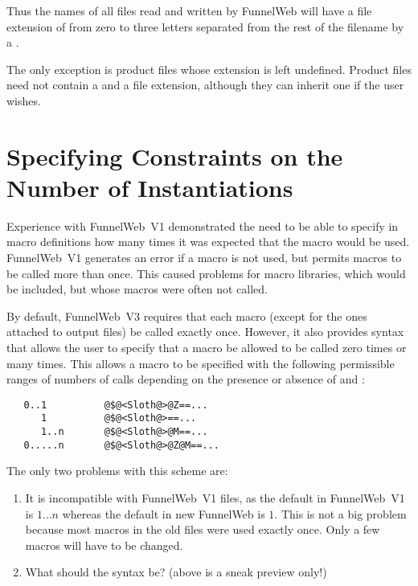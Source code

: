Thus the names of all files read and written by FunnelWeb will have a file
extension of from zero to three letters separated from the rest of the filename
by a .

The only exception is product files whose extension is left
undefined. Product files need not
contain a  and a file extension,
although they can inherit one if the user wishes.

\section{Specifying Constraints on the Number of Instantiations}

Experience with FunnelWeb~V1 demonstrated
the need to be able to specify in
macro definitions how many times it was expected that the macro would
be used. FunnelWeb~V1 generates an error if a macro is not used, but
permits macros to be called more than once. This caused problems for macro
libraries, which would be included, but whose macros were often not called.

By default, FunnelWeb~V3 requires that each macro (except for the ones
attached to output files) be called exactly once.
However, it also provides
syntax that allows the user to specify that a macro be allowed
to be called zero times or many times.
This allows a macro to be specified with the following permissible ranges
of numbers of calls depending on the presence or absence of  and
:

\begin{verbatim}
   0..1          @$@<Sloth@>@Z==...
      1          @$@<Sloth@>==...
      1..n       @$@<Sloth@>@M==...
   0.....n       @$@<Sloth@>@Z@M==...
\end{verbatim}

The only two problems with this scheme are:

\begin{enumerate}

\item It is incompatible with
FunnelWeb~V1 files, as the default in FunnelWeb~V1 is $1 \ldots n$
whereas the default in new FunnelWeb is $1$. This is not a big problem because
most macros in the old files were used exactly once. Only a few macros will
have to be changed.

\item What should the syntax be? (above is a sneak preview only!)

\end{enumerate}

